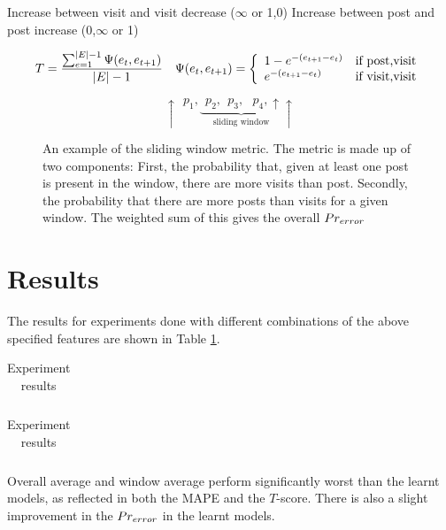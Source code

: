 \documentclass[12 pt]{article}
\begin{document}
Increase between visit and visit	decrease
($\infty$ or 1,0)
Increase between post and post		increase
(0,$\infty$ or 1)

\[
	\begin{array}{l l}
	T = \dfrac{%
		\sum_{e=1}^{|E|-1} \Psi(e_t,e_{t+1}) %
	}{|E|-1} &
		\Psi(e_t,e_{t+1}) = \left\{\begin{array}{l l}
				1-e^{-(e_{t+1} - e_t)}	& \text{if post,visit}\\
				e^{-(e_{t+1} - e_t)}			& \text{if visit,visit}\\
		\end{array}\right.
\end{array}
\]

\begin{figure}
\[
	\uparrow~~p_1,\underbrace{~~p_2,~~p_3,~~~p_4,\uparrow}_{\text{sliding window}}\uparrow
\]
\caption{An example of the sliding window metric. The metric is made up of two components: First, the probability that, given at least one post is present in the window, there are more visits than post. Secondly, the probability that there are more posts than visits for a given window. The weighted sum of this gives the overall $Pr_{error}$}\label{prerror}
\end{figure}

\section{Results}

The results for experiments done with different combinations of the above specified features are shown in Table \ref{expt1}.
\begin{table}
	\footnotesize
	\begin{centering}
	\begin{tabular}{|l|c|c|c|c|c|c|c|}
	\hline
	
	\hline
	\end{tabular}
	\caption{Experiment results}
	\label{expt1}
\end{centering}
\end{table}
\begin{centering}
\tiny
	\begin{longtable}{|l|c|c|c|c|c|c|}
	\caption{Experiment results}
	
	\end{longtable}
	\label{username}
\end{centering}


Overall average and window average perform significantly worst than the learnt models, as reflected in both the MAPE and the $T$-score. There is also a slight improvement in the  $Pr_{error}$ in the learnt models.
\end{document}
